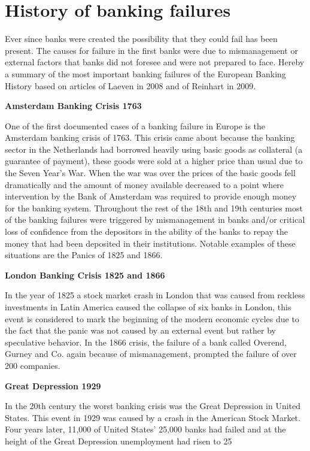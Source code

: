 \documentclass[DIV=calc, paper=a4, fontsize=11pt, twocolumn]{scrartcl}	 %
\begin{document}
\section*{History of banking failures}
Ever since banks were created the possibility that they could fail has been present. The causes for failure in the first banks were due to mismanagement or external factors that banks did not foresee and were not prepared to face. Hereby a summary of the most important banking failures of the European Banking History based on articles of Laeven in 2008 and of Reinhart in 2009. 

\textbf{Amsterdam Banking Crisis 1763}

One of the first documented cases of a banking failure in Europe is the Amsterdam 
banking crisis of 1763. This crisis came about because the banking sector in the Netherlands had borrowed 
heavily using basic goods as collateral (a guarantee of payment), these goods were sold at a higher price 
than usual due to the Seven Year’s War. When the war was over the prices of the basic goods fell 
dramatically and the amount of money available decreased to a point where intervention by the Bank of 
Amsterdam was required to provide enough money for the banking system. Throughout the rest of the 
18th and 19th centuries most of the banking failures were triggered by mismanagement in banks and/or 
critical loss of confidence from the depositors in the ability of the banks to repay the money that had been 
deposited in their institutions. Notable examples of these situations are the Panics of 1825 and 1866. 

\textbf{London Banking Crisis 1825 and 1866}

In the year of 1825 a stock market crash in London that was caused from reckless investments in Latin 
America caused the collapse of six banks in London, this event is considered to mark the beginning of the 
modern economic cycles due to the fact that the panic was not caused by an external event but rather by 
speculative behavior. In the 1866 crisis, the failure of a bank called Overend, Gurney and Co. again because 
of mismanagement, prompted the failure of over 200 companies. 

\textbf{Great Depression 1929}

In the 20th century the worst banking 
crisis was the Great Depression in United States. This event in 1929 was caused by a crash in the American 
Stock Market. Four years later, 11,000 of United States' 25,000 banks had failed and at the height of the 
Great Depression unemployment had risen to 25%
\end{document}
